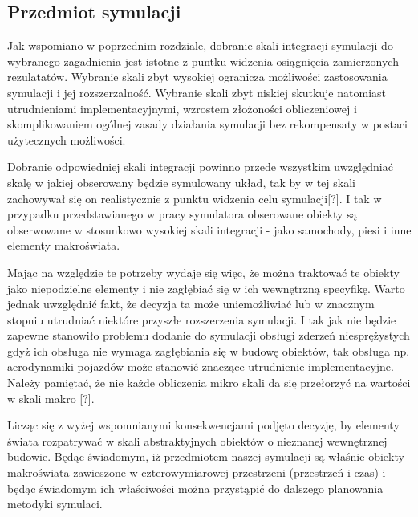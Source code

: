 \subsection{Przedmiot symulacji}
\par{
Jak wspomiano w poprzednim rozdziale, dobranie skali integracji symulacji do wybranego zagadnienia jest istotne z puntku widzenia osiągnięcia zamierzonych rezulatatów. Wybranie skali zbyt wysokiej ogranicza możliwości zastosowania symulacji i jej rozszerzalność. Wybranie skali zbyt niskiej skutkuje natomiast utrudnieniami implementacyjnymi, wzrostem złożoności obliczeniowej i skomplikowaniem ogólnej zasady działania symulacji bez rekompensaty w postaci użytecznych możliwości.
}
\par{
Dobranie odpowiedniej skali integracji powinno przede wszystkim uwzględniać skalę w jakiej obserowany będzie symulowany układ, tak by w tej skali zachowywał się on realistycznie z punktu widzenia celu symulacji[?]. I tak w przypadku przedstawianego w pracy symulatora obserowane obiekty są obserwowane w stosunkowo wysokiej skali integracji - jako samochody, piesi i inne elementy makroświata.
}
\par{
Mając na względzie te potrzeby wydaje się więc, że można traktować te obiekty jako niepodzielne elementy i nie zagłębiać się w ich wewnętrzną specyfikę. Warto jednak uwzględnić fakt, że decyzja ta może uniemożliwiać lub w znacznym stopniu utrudniać niektóre przyszłe rozszerzenia symulacji. I tak jak nie będzie zapewne stanowiło problemu dodanie do symulacji obsługi zderzeń niesprężystych gdyż ich obsługa nie wymaga zagłębiania się w budowę obiektów, tak obsługa np. aerodynamiki pojazdów może stanowić znaczące utrudnienie implementacyjne. Należy pamiętać, że nie każde obliczenia mikro skali da się przełorzyć na wartości w skali makro [?].
}
\par{
Licząc się z wyżej wspomnianymi konsekwencjami podjęto decyzję, by elementy świata rozpatrywać w skali abstraktyjnych obiektów o nieznanej wewnętrznej budowie. Będąc świadomym, iż przedmiotem naszej symulacji są właśnie obiekty makroświata zawieszone w czterowymiarowej przestrzeni (przestrzeń i czas) i będąc świadomym ich właściwości można przystąpić do dalszego planowania metodyki symulaci.
}

